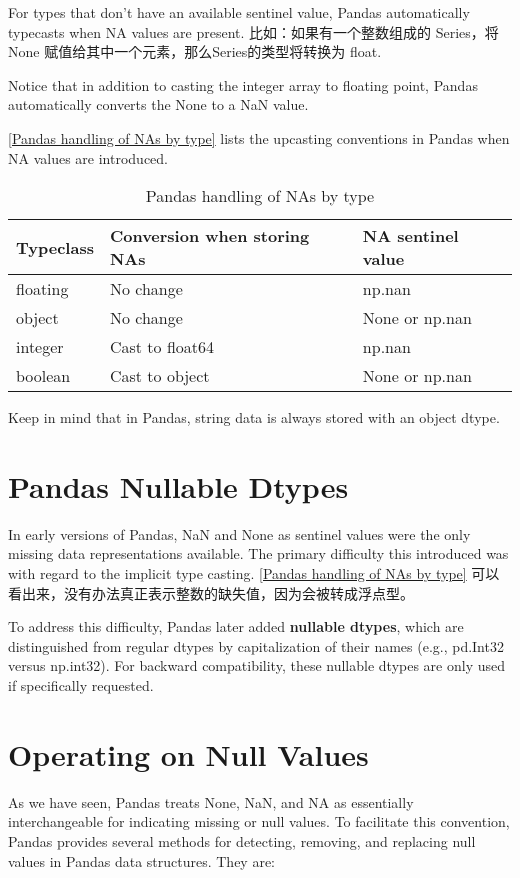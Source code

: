 For types that don't have an available sentinel value, Pandas automatically typecasts
when NA values are present. 比如：如果有一个整数组成的 Series，将 None 赋值给其中一个元素，那么Series的类型将转换为 float.

Notice that in addition to casting the integer array to floating point, Pandas automatically converts the None to a NaN value.

\autoref{Pandas handling of NAs by type} lists the upcasting conventions in Pandas when NA values are introduced.

\begin{table}
    \centering
    \caption{Pandas handling of NAs by type}
    \label{Pandas handling of NAs by type}
    \begin{tabular}{lll}
        \hline
        Typeclass & Conversion when storing NAs & NA sentinel value \\
        \hline
        floating  & No change                   & np.nan            \\
        object    & No change                   & None or np.nan    \\
        integer   & Cast to float64             & np.nan            \\
        boolean   & Cast to object              & None or np.nan    \\
        \hline
    \end{tabular}
\end{table}

Keep in mind that in Pandas, string data is always stored with an object dtype.

\section{Pandas Nullable Dtypes}
In early versions of Pandas, NaN and None as sentinel values were the only missing
data representations available. The primary difficulty this introduced was with regard
to the implicit type casting. \autoref{Pandas handling of NAs by type} 可以看出来，没有办法真正表示整数的缺失值，因为会被转成浮点型。

To address this difficulty, Pandas later added \textbf{nullable dtypes}, which are distinguished
from regular dtypes by capitalization of their names (e.g., pd.Int32 versus np.int32).
For backward compatibility, these nullable dtypes are only used if specifically
requested.
\section{Operating on Null Values}
As we have seen, Pandas treats None, NaN, and NA as essentially interchangeable for
indicating missing or null values. To facilitate this convention, Pandas provides several methods for detecting, removing, and replacing null values in Pandas data structures. They are:

